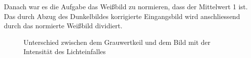 \documentclass[12pt, oneside, a4paper, \docLanguage]{report}
\begin{document}
\newpage
Danach war es die Aufgabe das Weißbild zu normieren, dass der Mittelwert 1 ist. Das durch Abzug des Dunkelbildes korrigierte Eingangsbild wird anschliessend durch das normierte Weißbild dividiert.

\begin{figure}[hbt!]
  	\centering
	\hfill
	\caption{Unterschied zwischen dem Grauwertkeil und dem Bild mit der Intensität des Lichteinfalles}
\end{figure}
\newpage
\end{document}
